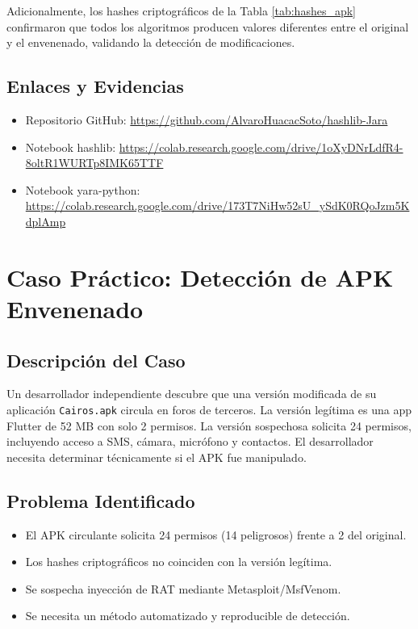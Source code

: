 \documentclass[12pt,a4paper]{article}
\begin{document}
Adicionalmente, los hashes criptográficos de la Tabla
\ref{tab:hashes_apk} confirmaron que todos los algoritmos producen
valores diferentes entre el original y el envenenado, validando la
detección de modificaciones.

\subsection{Enlaces y Evidencias}

\begin{itemize}
\item Repositorio GitHub: \url{https://github.com/AlvaroHuacacSoto/hashlib-Jara}
\item Notebook hashlib: \url{https://colab.research.google.com/drive/1oXyDNrLdfR4-8oltR1WURTp8IMK65TTF}
\item Notebook yara-python: \url{https://colab.research.google.com/drive/173T7NiHw52sU_ySdK0RQoJzm5KdplAmp}
\end{itemize}

\section{Caso Práctico: Detección de APK Envenenado}

\subsection{Descripción del Caso}

Un desarrollador independiente descubre que una versión modificada de su
aplicación \texttt{Cairos.apk} circula en foros de terceros. La versión
legítima es una app Flutter de 52 MB con solo 2 permisos. La versión
sospechosa solicita 24 permisos, incluyendo acceso a SMS, cámara,
micrófono y contactos. El desarrollador necesita determinar técnicamente
si el APK fue manipulado.

\subsection{Problema Identificado}

\begin{itemize}
\item El APK circulante solicita 24 permisos (14 peligrosos) frente a 2 del original.
\item Los hashes criptográficos no coinciden con la versión legítima.
\item Se sospecha inyección de RAT mediante Metasploit/MsfVenom.
\item Se necesita un método automatizado y reproducible de detección.
\end{itemize}
\end{document}
